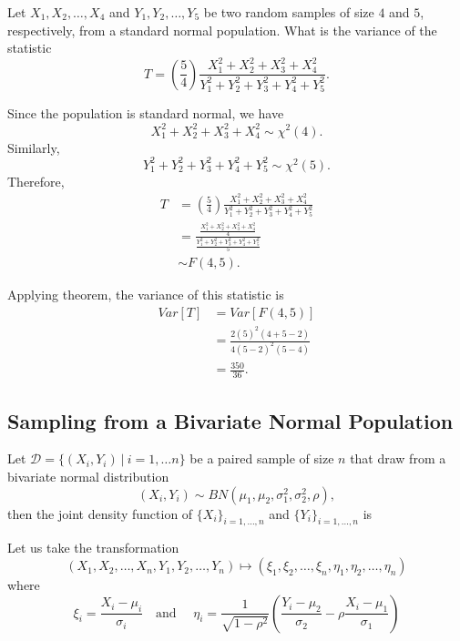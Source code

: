 \begin{example}
    Let $X_1, X_2, \ldots, X_4$ and $Y_1, Y_2, \ldots, Y_5$ be two random samples 
    of size $4$ and $5$, respectively, from a standard normal population. What is 
    the variance of the statistic 
    \[
        T = \left( \frac{5}{4} \right) \frac{X^2_1 + X^2_2 + X^2_3 + X^2_4}{Y^2_1 + Y^2_2 + Y^2_3 + Y^2_4 + Y^2_5}.
    \]
\end{example}
\begin{solution}
    Since the population is standard normal, we have 
    \[
        X^2_1 + X^2_2 + X^2_3 + X^2_4 \sim \chi^2(4).
    \]
    Similarly, 
    \[
        Y^2_1 + Y^2_2 + Y^2_3 + Y^2_4 + Y^2_5 \sim \chi^2(5).
    \]
    Therefore, 
    \begin{align*}
        T &= \left( \frac{5}{4} \right) \frac{X^2_1 + X^2_2 + X^2_3 + X^2_4}{Y^2_1 + Y^2_2 + Y^2_3 + Y^2_4 + Y^2_5}\\
        &= \frac{\displaystyle \frac{X^2_1 + X^2_2 + X^2_3 + X^2_4}{4} }{ \displaystyle \frac{Y^2_1 + Y^2_2 + Y^2_3 + Y^2_4 + Y^2_5}{5}}\\
        &\sim F(4,5).
    \end{align*}

    Applying theorem, the variance of this statistic is 
    \begin{align*}
        Var[T] &= Var[F(4,5)]\\
        &= \frac{2 (5)^2 (4 + 5 - 2)}{4 (5 - 2)^2 (5 - 4)}\\
        &= \frac{350}{36}.
    \end{align*}
\end{solution}

\subsection{Sampling from a Bivariate Normal Population}

Let $\mathcal{D} = \{ (X_i, Y_i) \> | \> i = 1, \ldots n\}$ be a paired 
    sample of size $n$ that draw from a bivariate normal distribution
    \[
        (X_i, Y_i) \sim BN(\mu_1, \mu_2, \sigma^2_1, \sigma^2_2, \rho),
    \]
    then the joint density function of $\{X_i \}_{i=1, \ldots, n}$ and 
    $\{Y_i \}_{i=1, \ldots, n}$ is 

Let us take the transformation
\[
    (X_1, X_2, \ldots, X_n, Y_1, Y_2, \ldots, Y_n) \mapsto
    (\xi_1, \xi_2, \ldots, \xi_n, \eta_1, \eta_2, \ldots, \eta_n)
\]
where
\begin{equation}
    \xi_i = \frac{X_i - \mu_i}{\sigma_i} \quad 
    \text{and } \quad \eta_i = \frac{1}{\sqrt{1 - \rho^2}} \left(
        \frac{Y_i - \mu_2}{\sigma_2} - \rho \frac{X_i - \mu_1}{\sigma_1}
    \right)
\end{equation}

